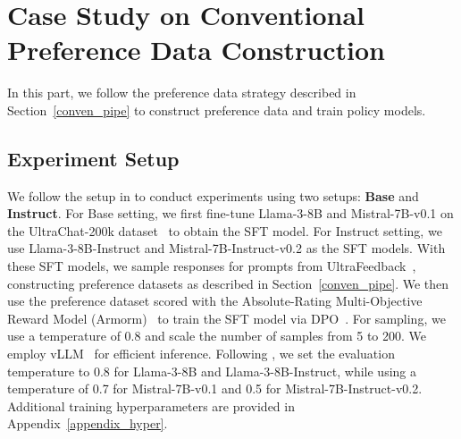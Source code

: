 



\section{Case Study on Conventional Preference Data Construction}


In this part, we follow the preference data strategy described in Section~\ref{conven_pipe} to construct preference data and train policy models.

\subsection{Experiment Setup}
\label{imp_detail}

We follow the setup in \citet{meng2024simpo} to conduct experiments using two setups: \textbf{Base} and \textbf{Instruct}. For Base setting, we first fine-tune Llama-3-8B and Mistral-7B-v0.1 on the UltraChat-200k dataset~\cite{ding2023enhancing} to obtain the SFT model. For Instruct setting, we use Llama-3-8B-Instruct and Mistral-7B-Instruct-v0.2 as the SFT models.  
With these SFT models, we sample responses for prompts from UltraFeedback~\cite{pmlr-v235-cui24f}, constructing preference datasets as described in Section~\ref{conven_pipe}. 
We then use the preference dataset scored with the Absolute-Rating Multi-Objective Reward Model (Armorm)~\cite{wang2024arithmetic} to train the SFT model via DPO~\cite{rafailov2023direct}.  
For sampling, we use a temperature of 0.8 and scale the number of samples from 5 to 200. 
We employ vLLM~\cite{kwon2023efficient} for efficient inference.
Following \citet{meng2024simpo}, we set the evaluation temperature to 0.8 for Llama-3-8B and Llama-3-8B-Instruct, while using a temperature of 0.7 for Mistral-7B-v0.1 and 0.5 for Mistral-7B-Instruct-v0.2. 
Additional training hyperparameters are provided in Appendix~\ref{appendix_hyper}.


